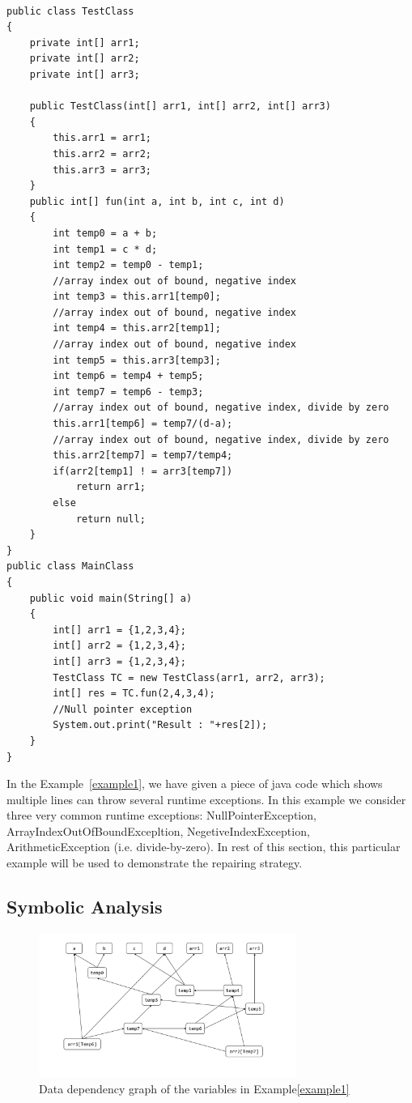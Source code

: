 \documentclass{sigplanconf}
\begin{document}
\lstset{language=Java, caption=Java code which may throws runtime exceptions, label=example1}
\begin{lstlisting}

public class TestClass
{
	private int[] arr1;
	private int[] arr2;
	private int[] arr3;
		
	public TestClass(int[] arr1, int[] arr2, int[] arr3)
	{
		this.arr1 = arr1;
		this.arr2 = arr2;
		this.arr3 = arr3;
	}
	public int[] fun(int a, int b, int c, int d)
	{
		int temp0 = a + b;
		int temp1 = c * d;
		int temp2 = temp0 - temp1;
		//array index out of bound, negative index
		int temp3 = this.arr1[temp0];
		//array index out of bound, negative index
		int temp4 = this.arr2[temp1];
		//array index out of bound, negative index
		int temp5 = this.arr3[temp3];
		int temp6 = temp4 + temp5;
		int temp7 = temp6 - temp3;
		//array index out of bound, negative index, divide by zero
		this.arr1[temp6] = temp7/(d-a);
		//array index out of bound, negative index, divide by zero
		this.arr2[temp7] = temp7/temp4;
		if(arr2[temp1] ! = arr3[temp7])
			return arr1;
		else
			return null;
	}
}
public class MainClass 
{
	public void main(String[] a) 
	{
		int[] arr1 = {1,2,3,4};
		int[] arr2 = {1,2,3,4};
		int[] arr3 = {1,2,3,4};
		TestClass TC = new TestClass(arr1, arr2, arr3);
		int[] res = TC.fun(2,4,3,4);
		//Null pointer exception
		System.out.print("Result : "+res[2]);
	}    
}
\end{lstlisting}

In the Example~\ref{example1}, we have given a piece of java code which shows multiple lines can throw several runtime exceptions. 
In this example we consider three very common runtime exceptions: NullPointerException, ArrayIndexOutOfBoundExcepltion, NegetiveIndexException, 
ArithmeticException (i.e. divide-by-zero). In rest of this section, this particular example will be used to demonstrate the repairing strategy.

\subsection{Symbolic Analysis}
\label{subsec:symb}


\begin{figure}[!htb]
\centering
\includegraphics[width=3.3in]{images/depG.pdf}
\caption{Data dependency graph of the variables in Example\ref{example1}}
\label{fig:datadep}
\end{figure}
\end{document}
